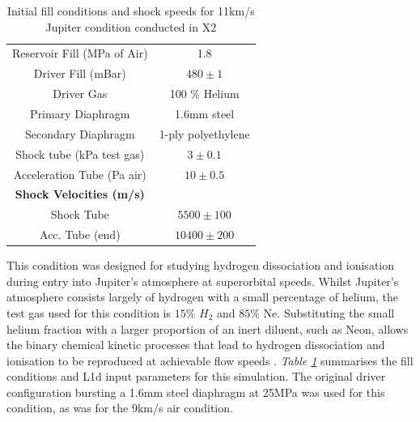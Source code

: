 \documentclass[a4paper,10pt]{article}
\begin{document}
\begin{table}[h]
\begin{center}  %
\begin{tabular*}{0.65\textwidth}%
     {@{\extracolsep{\fill}}cc}
\hline Reservoir Fill (MPa of Air) & 1.8 \\
Driver Fill (mBar) & $480 \pm 1$ \\
Driver Gas & 100 \% Helium \\
Primary Diaphragm & 1.6mm steel \\
Secondary Diaphragm & 1-ply polyethylene \\
Shock tube (kPa test gas) & $ 3 \pm 0.1$ \\
Acceleration Tube (Pa air) & $ 10 \pm 0.5$ \\
\textbf{Shock Velocities (m/s)} \\
Shock Tube & $5500 \pm 100$ \\
Acc. Tube (end) & $10400 \pm 200$   \\
\hline
\end{tabular*}
\caption{Initial fill conditions and shock speeds for 11km/s Jupiter condition conducted in X2}
\label{table:x2_jupiter_fills}
\end{center}
\end{table}

This condition was designed for studying hydrogen dissociation and ionisation during entry into Jupiter's atmosphere at superorbital speeds.  Whilst Jupiter's atmosphere consists largely of hydrogen with a small percentage of helium, the test gas used for this condition is $15\%$ $H_{2}$ and $85\%$ Ne.  Substituting the small helium fraction with a larger proportion of an inert diluent, such as Neon, allows the binary chemical kinetic processes that lead to hydrogen dissociation and ionisation to be reproduced at achievable flow speeds \cite{edwards}.  \emph{Table \ref{table:x2_jupiter_fills}} summarises the fill conditions and L1d input parameters for this simulation.  The original driver configuration bursting a 1.6mm steel diaphragm at 25MPa was used for this condition, as was for the 9km/s air condition.

\par \medskip
\end{document}

